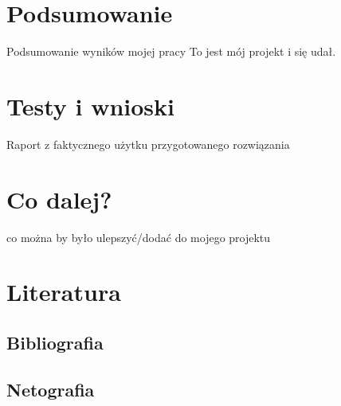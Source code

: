 \documentclass[a4paper,12pt,oneside,onecolumn]{book}
\begin{document}
\chapter*{Podsumowanie}
Podsumowanie wyników mojej pracy
To jest mój projekt i się udał.
\chapter{Testy i wnioski}
Raport z faktycznego użytku przygotowanego rozwiązania
\chapter{Co dalej?}
co można by było ulepszyć/dodać do mojego projektu

% 

% 
% 

% 


\newpage
\chapter*{Literatura} %

\section*{Bibliografia}
\setcounter{mybibcounter}{0} 
\printbibliography[heading=none, notkeyword=netografia] %

\section*{Netografia}
\setcounter{mybibcounter}{0} 
\printbibliography[heading=none, keyword=netografia] %


\clearpage
{}
{}
\listoffigures

\clearpage
{}
{}
\listoftables

\clearpage
{}
{}
\lstlistoflistings
\end{document}

